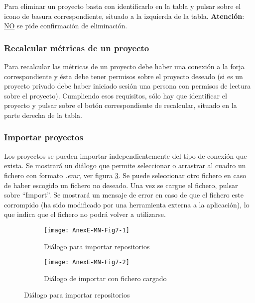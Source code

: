 Para eliminar un proyecto basta con identificarlo en la tabla y pulsar sobre el icono de basura correspondiente, situado a la izquierda de la tabla. \textbf{Atención}: \underline{NO} se pide confirmación de eliminación.

\subsubsection{Recalcular métricas de un proyecto}

Para recalcular las métricas de un proyecto debe haber una conexión a la forja correspondiente y ésta debe tener permisos sobre el proyecto deseado (si es un proyecto privado debe haber iniciado sesión una persona con permisos de lectura sobre el proyecto). Cumpliendo esos requisitos, sólo hay que identificar el proyecto y pulsar sobre el botón correspondiente de recalcular, situado en la parte derecha de la tabla.

\subsubsection{Importar proyectos}
Los proyectos se pueden importar independientemente del tipo de conexión que exista. Se mostrará un diálogo que permite seleccionar o arrastrar al cuadro un fichero con formato \textit{.emr}, ver figura \ref{fig:AnexE-MN-Fig7}. Se puede seleccionar otro fichero en caso de haber escogido un fichero no deseado. Una vez se cargue el fichero, pulsar sobre ``Import''. Se mostrará un mensaje de error en caso de que el fichero este corrompido (ha sido modificado por una herramienta externa a la aplicación), lo que indica que el fichero no podrá volver a utilizarse.
\begin{figure}[!h]
	\centering
	\begin{subfigure}{.45\textwidth}
		\centering
		\texttt{[image: AnexE-MN-Fig7-1]}
		\caption{Diálogo para importar repositorios}
		\label{fig:AnexE-MN-Fig7-1}
	\end{subfigure}\hfill
	\begin{subfigure}{.45\textwidth}
		\centering
		\texttt{[image: AnexE-MN-Fig7-2]}
		\caption{Diálogo de importar con fichero cargado}
		\label{fig:AnexE-MN-Fig7-2}
	\end{subfigure}
	\caption{Diálogo para importar repositorios}
	\label{fig:AnexE-MN-Fig7}
\end{figure}

